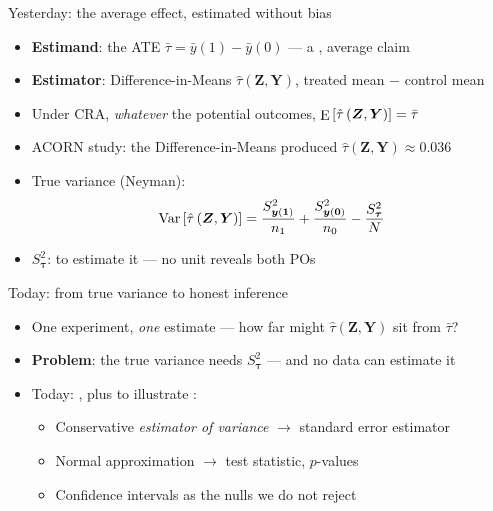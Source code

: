 \documentclass[table, xcolor = {dvipsnames}, 9pt]{beamer}
\theoremstyle{plain}
\newcommand{\mh}[1]{{\color{magenta}{#1}}}
\DeclareMathOperator{\E}{\rm{E}}
\DeclareMathOperator{\Var}{\rm{Var}}
\begin{document}
\begin{frame}[t]{Yesterday: the average effect, estimated without bias}
\vfill
\begin{itemize} \vfill
\item \textbf{Estimand}: the ATE $\bar{\tau} = \bar{y}(1) - \bar{y}(0)$ --- a \mh{composite}, average claim \vfill
\item \textbf{Estimator}: Difference-in-Means $\hat{\tau}\left(\bm{Z}, \bm{Y}\right)$, treated mean $-$ control mean \vfill
\item Under CRA, \emph{whatever} the potential outcomes, $\E\left[\hat{\tau}\left(\bm{Z}, \bm{Y}\right)\right] = \bar{\tau}$ \vfill
\item ACORN study: the Difference-in-Means produced $\hat{\tau}\left(\bm{Z}, \bm{Y}\right) \approx 0.036$ \vfill
\item True variance (Neyman):
\begin{equation*}
\Var\left[\hat{\tau}\left(\bm{Z}, \bm{Y}\right)\right] = \frac{S^2_{\bm{y}(\bm{1})}}{n_1} + \frac{S^2_{\bm{y}(\bm{0})}}{n_0} - \frac{S^2_{\bm{\tau}}}{N}
\end{equation*} \vfill
\item $S^2_{\bm{\tau}}$: \mh{no data} to estimate it --- no unit reveals both POs \vfill
\end{itemize} \vfill
\end{frame}
\begin{frame}[t]{Today: from true variance to honest inference}
\vfill
\begin{itemize} \vfill
\item One experiment, \emph{one} estimate --- how far might $\hat{\tau}\left(\bm{Z}, \bm{Y}\right)$ sit from $\bar{\tau}$? \vfill
\item \textbf{Problem}: the true variance needs $S^2_{\bm{\tau}}$ --- and no data can estimate it \vfill
\item Today: \mh{ACORN}, plus \mh{village heads} to illustrate \citep[Ch.~2]{gerbergreen2012}: \vfill
\begin{itemize} \vfill
\item Conservative \emph{estimator of variance} $\to$ standard error estimator \vfill
\item Normal approximation $\to$ test statistic, $p$-values \vfill
\item Confidence intervals as the nulls we do not reject \vfill
\end{itemize} \vfill
\end{itemize} \vfill
\end{frame}
\end{document}
